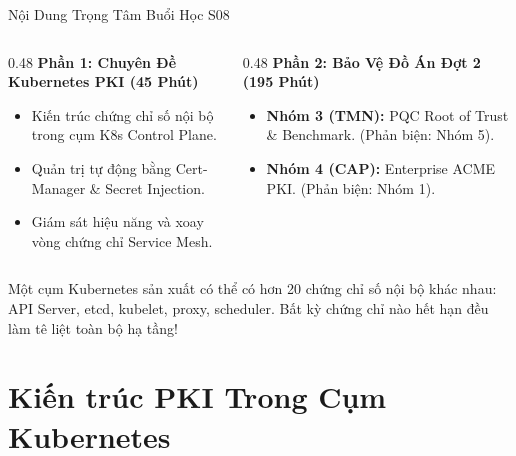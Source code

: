 \begin{frame}{Nội Dung Trọng Tâm Buổi Học S08}
  \begin{columns}[T]
    \begin{column}{0.48\textwidth}
      \textbf{Phần 1: Chuyên Đề Kubernetes PKI (45 Phút)}
      \begin{itemize}\small
        \item Kiến trúc chứng chỉ số nội bộ trong cụm K8s Control Plane.
        \item Quản trị tự động bằng Cert-Manager \& Secret Injection.
        \item Giám sát hiệu năng và xoay vòng chứng chỉ Service Mesh.
      \end{itemize}
    \end{column}
    \begin{column}{0.48\textwidth}
      \textbf{Phần 2: Bảo Vệ Đồ Án Đợt 2 (195 Phút)}
      \begin{itemize}\small
        \item \textbf{Nhóm 3 (TMN):} PQC Root of Trust \& Benchmark. (Phản biện: Nhóm 5).
        \item \textbf{Nhóm 4 (CAP):} Enterprise ACME PKI. (Phản biện: Nhóm 1).
      \end{itemize}
    \end{column}
  \end{columns}

  \begin{keybox}
    Một cụm Kubernetes sản xuất có thể có hơn 20 chứng chỉ số nội bộ khác nhau: API Server, etcd, kubelet, proxy, scheduler. Bất kỳ chứng chỉ nào hết hạn đều làm tê liệt toàn bộ hạ tầng!
  \end{keybox}
\end{frame}

\section{Kiến trúc PKI Trong Cụm Kubernetes}

